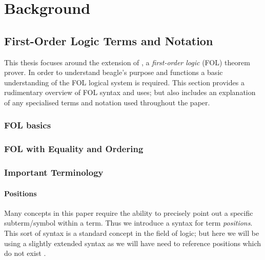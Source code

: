 
\chapter{Background}
\label{cha:background}

\section{First-Order Logic Terms and Notation}
\label{sec:fol}

This thesis focuses around the extension of \beagle, a \emph{first-order logic} (FOL) theorem prover.
In order to understand beagle's purpose and functions a basic understanding of the FOL logical system
is required. This section provides a rudimentary overview of FOL syntax and uses;
but also includes an explanation of any specialised terms and notation used throughout the paper.

\subsection{FOL basics}

\subsection{FOL with Equality and Ordering}

\subsection{Important Terminology}
\label{sec:terminology}

\subsubsection{Positions}
Many concepts in this paper require the ability to precisely point out a specific
subterm/symbol within a term. Thus we introduce a syntax for term \emph{positions}.
This sort of syntax is a standard concept in the field of logic; but here we
will be using a slightly extended syntax as we will have need to reference
positions which do not exist \cite{shulz12}.

